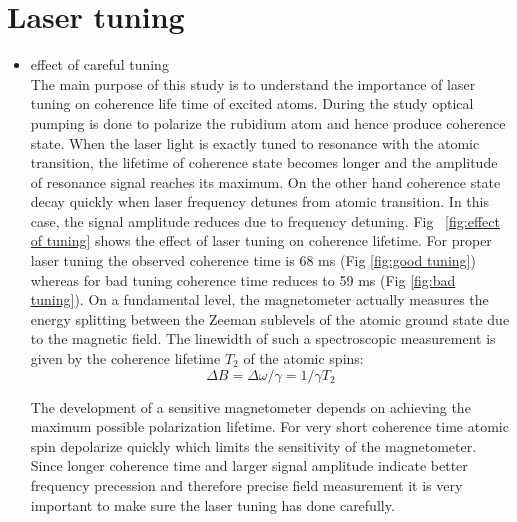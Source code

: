    \section{Laser tuning} 
   \begin{itemize}
   \item effect of careful tuning\\
	The main purpose of this study is to understand the importance of laser tuning on coherence life time of excited atoms. During the study optical pumping is done to polarize the rubidium atom and hence produce coherence state. When the laser light  is  exactly tuned to resonance with the atomic transition, the lifetime of coherence state becomes longer and the amplitude of resonance signal reaches its maximum. On the other hand coherence state decay  quickly when laser frequency detunes from atomic transition. In this case, the signal amplitude reduces due to frequency detuning. Fig~ \ref{fig:effect of tuning} shows the effect of laser tuning on coherence lifetime. For proper laser tuning the observed coherence time is 68 ms (Fig \ref{fig:good tuning}) whereas for bad tuning coherence time reduces to 59 ms (Fig \ref{fig:bad tuning}). On a fundamental level, the magnetometer actually measures the energy splitting between the Zeeman sublevels of the atomic ground state due to the magnetic field. The linewidth of such a spectroscopic measurement is given by the coherence lifetime $T_2$ of the atomic spins:
\begin{equation}
 ΔB = \Delta\omega/\gamma  = 1/γ T_2
\end{equation}

The development of a sensitive magnetometer depends on achieving the maximum possible polarization lifetime.  For very short coherence time atomic spin depolarize quickly which limits the sensitivity of the magnetometer.
Since  longer coherence time and larger signal amplitude indicate better frequency precession and therefore precise field measurement it is very important to make sure the laser tuning has done carefully.
   \begin{figure}
    \centering
 

\end{figure}
\end{itemize}
